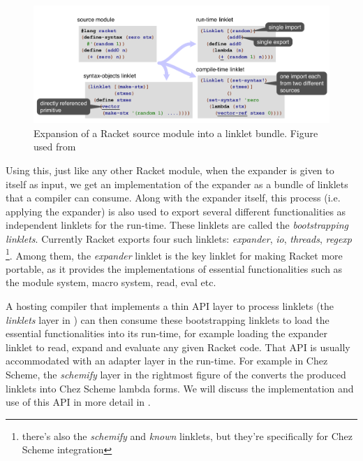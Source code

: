 \begin{figure}[h]
  \centering
  \includegraphics[scale=0.3]{img/racket-expand-example}
  \caption{Expansion of a Racket source module into a linklet
    bundle. Figure used from \cite{racket-on-chez-19}}
  \label{fig:racket-expand-example}
\end{figure}

Using this, just like any other Racket module, when the expander is
given to itself as input, we get an implementation of the expander as
a bundle of linklets that a compiler can consume. Along with the
expander itself, this process (i.e. applying the expander) is also
used to export several different functionalities as independent
linklets for the run-time. These linklets are called the
\emph{bootstrapping linklets}. Currently Racket exports four such
linklets: \emph{expander}, \emph{io}, \emph{threads},
\emph{regexp} \footnote{there's also the \emph{schemify} and
  \emph{known} linklets, but they're specifically for Chez Scheme
  integration}. Among them, the \emph{expander} linklet is the key
linklet for making Racket more portable, as it provides the
implementations of essential functionalities such as the module
system, macro system, read, eval etc.

A hosting compiler that implements a thin API layer to process
linklets (the \emph{linklets} layer in )
can then consume these bootstrapping linklets to load the essential
functionalities into its run-time, for example loading the expander
linklet to read, expand and evaluate any given Racket code. That API
is usually accommodated with an adapter layer in the run-time. For
example in Chez Scheme, the \emph{schemify} layer in the rightmost
figure of the  converts the produced
linklets into Chez Scheme lambda forms. We will discuss the
implementation and use of this API in more detail in
.
